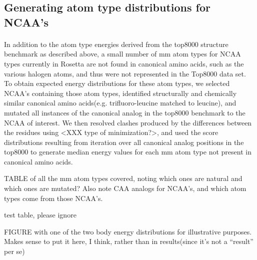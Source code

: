 \subsection{Generating atom type distributions for NCAA's} 
\paragraph{}
In addition to the atom type energies derived from the top8000 structure benchmark as described above, a small number of mm atom types for NCAA types currently in Rosetta are not found in canonical amino acids, such as the various halogen atoms, and thus were not represented in the Top8000 data set. To obtain expected energy distributions for these atom types, we selected NCAA's containing those atom types, identified structurally and chemically similar canonical amino acids(e.g. trifluoro-leucine matched to leucine), and mutated all instances of the canonical analog in the top8000 benchmark to the NCAA of interest. We then resolved clashes produced by the differences between the residues using <XXX type of minimization?>, and used the score distributions resulting from iteration over all canonical analog positions in the top8000 to generate median energy values for each mm atom type not present in canonical amino acids.

TABLE of all the mm atom types covered, noting which ones are natural and which ones are mutated? Also note CAA analogs for NCAA's, and which atom types come from those NCAA's.

\begin{table}[h!]
  \begin{center}
    \caption{test table, please ignore}
    \label{table1}
    \end{center}
  \end{table}

FIGURE with one of the two body energy distributions for illustrative purposes. Makes sense to put it here, I think, rather than in results(since it's not a ``result'' per se)

